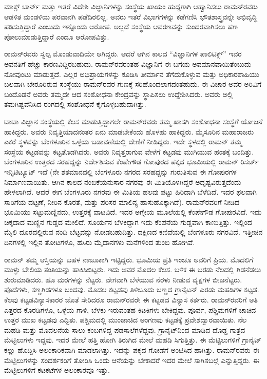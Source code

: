 ಮಾಕ್ಸ್ ಬಾರ್ನ್ ಮತ್ತು ಇತರೆ ವಿದೇಶಿ ವಿಜ್ಞಾನಿಗಳನ್ನು ಸಂಸ್ಥೆಯ ಖಾಯಂ ಹುದ್ದೆಗಾಗಿ ಆಹ್ವಾನಿಸಲು ರಾಮನ್‍ರವರು ಆಡಳಿತ ಮಂಡಳಿಯ ಪರವಾನಗಿ ಪಡೆದಿರಲಿಲ್ಲ. ಅವರು ಇತರೆ ವಿಭಾಗಗಳನ್ನು ಕಡೆಗಣಿಸಿ ಭೌತಶಾಸ್ತ್ರವನ್ನೇ ಅಭಿವೃದ್ಧಿ ಪಡಿಸುತ್ತಿದ್ದಾರೆ ಎಂಬುದು ಇನ್ನೊಂದು ಆರೋಪ. ಅಲ್ಲದೆ ಸಂಸ್ಥೆಯ ಆವರಣವನ್ನು ಸುಂದರವಾಗಿಸಲು ಹಣ ಪೋಲುಮಾಡುತ್ತಿದ್ದಾರೆ ಎಂದೂ ಆರೋಪವಿತ್ತು.

ರಾಮನ್‍ರವರು ಸ್ವಲ್ಪ ಮೊಂಡುವಾದಿಯೇ ಆಗಿದ್ದರು. ಆದರೆ ಆಗಿನ ಕಾಲದ “ವಿಜ್ಞಾನಿಗಳ ಪಾಲಿಟಿಕ್ಸ್” ಇವರ ಅವನತಿಗೆ ಹೆಚ್ಚು ಕಾರಣವಿದ್ದಿರಬಹುದು. ರಾಮನ್‍ರವರಂತಹ ವಿಜ್ಞಾನಿಗೆ ಈ ಬಗೆಯ ಅವಮಾನವಾಯಿತೆಂಬುದು ನೋವುಂಟು ಮಾಡುತ್ತದೆ. ಎಲ್ಲರ ಅಭಿಪ್ರಾಯಗಳನ್ನು ಕೂಡಿಸಿ ತೀರ್ಮಾನ ತೆಗೆದುಕೊಳ್ಳುವ ಮತ್ತು ಅಧಿಕಾರಶಾಹಿಯು ಬಲವಾಗಿ ಬೇರೂರಿರುವ ಸಂಸ್ಥೆಯು ರಾಮನ್‍ರವರ ಗುಣಕ್ಕೆ ಸರಿಹೊಂದಲಾಗದಂತಹುದು. ಈ ವಿಚಾರ ಅವರ ಅರಿವಿಗೆ ಬಂದೊಡನೆ ಅವರು ತಮ್ಮದೇ ಆದ ಸಂಶೋಧನಾ ಕೇಂದ್ರವನ್ನು ಸ್ಥಾಪಿಸಲು ಉದ್ದೇಶಿಸಿದರು. ಅವರು ಅಲ್ಲಿ ತಮಗಿಷ್ಟವೆನಿಸಿದ ರಂಗದಲ್ಲಿ ಸಂಶೋಧನೆ ಕೈಗೊಳ್ಳಬಹುದಾಗಿತ್ತು.



ಟಾಟಾ ವಿಜ್ಞಾನ ಸಂಸ್ಥೆಯಲ್ಲಿ ಕೆಲಸ ಮಾಡುತ್ತಿದ್ದಾಗಲೇ ರಾಮನ್‍ರವರು ತಮ್ಮ ಖಾಸಗಿ ಸಂಶೋಧನಾ ಸಂಸ್ಥೆಗೆ ಯೋಜನೆ ಹಾಕಿದ್ದರು. ಅವರು ನಿವೃತ್ತಿಯಾದನಂತರ ಏನು ಮಾಡಬೇಕೆಂದು ಹೊಳಹು ಹಾಕಿದ್ದರು. ಮೈಸೂರಿನ ಮಹಾರಾಜರು  ಎಕರೆ ಸ್ಥಳವನ್ನು ಬೆಂಗಳೂರಿನ ಒಳ್ಳೆಯ ಬಡಾವಣೆಯಲ್ಲಿ ದೇಣಿಗೆ ನೀಡಿದ್ದರು. ಇದೇ ಸ್ಥಳದಲ್ಲಿ ರಾಮನ್ ತಮ್ಮ ಸಂಸ್ಥೆಯ ಕಟ್ಟಡವನ್ನು ಕಟ್ಟತೊಡಗಿದರು. ಅವರು ನಿವೃತ್ತರಾಗುವ ವೇಳೆಗೆ ಕಟ್ಟಡವು ಮುಗಿಯುವ ಹಂತಕ್ಕೆ ಬಂದಿತ್ತು. ಬೆಂಗಳೂರಿನ ಉತ್ತರದ ಸರಹದ್ದನ್ನು ನಿರ್ದೇಶಿಸುವ ಕೆಂಪೇಗೌಡ ಗೋಪುರದ ಪಕ್ಕದ ಭೂಮಿಯಲ್ಲಿ ರಾಮನ್ ರಿಸರ್ಚ್ ಇನ್ಸಿಟಿಟ್ಯೂಟ್ ಇದೆ (ನೇ ಶತಮಾನದಲ್ಲಿ ಬೆಂಗಳೂರು ನಗರದ ಸರಹದ್ದನ್ನು ಗುರುತಿಸುವ ಈ ಗೋಪುರಗಳ ನಿರ್ಮಾಣವಾಯಿತು. ಆಗಿನ ಕಾಲದ ನಂಬಿಕೆಯನುಸಾರ ನಗರವು ಈ ಮಿತಿಯೊಳಗಿದ್ದರೆ ಅದೃಷ್ಟವಿರುತ್ತದೆಂದು ಹೇಳಲಾಗಿದೆ. ಆದರೆ ಈಗ ಬೆಂಗಳೂರು ನಗರವು ಈ ಮಿತಿಯ ಹಲವು ಪಟ್ಟು ಹಿರಿದಾಗಿ ಬೆಳೆದಿದೆ. ಇದರ ಫಲವಾಗಿ ಸಾರಿಗೆಯ ದಟ್ಟಣೆ, ನೀರಿನ ಕೊರತೆ, ಮತ್ತು ಪರಿಸರ ಮಾಲಿನ್ಯ ಹಾಸುಹೊಕ್ಕಾಗಿದೆ). ರಾಮನ್‍ರವರಿಗೆ ನೀಡಿದ ಭೂಮಿಯು ಸಟ್ಟುಮಣ್ಣಿನದು, ಉತ್ತರಕ್ಕೆ ವಾಟವಿದೆ. ಇದರ ಅಗ್ನೇಯ ಮೂಲೆಯಲ್ಲಿ ಕೆಂಪೇಗೌಡ ಗೋಪುರವಿದೆ. ಇದು ಚಿಕ್ಕದಾದ ಮಣ್ಣಿನ ಗುಡ್ಡದ ಮೇಲಿದೆ. ಸೂರ್ಯನ ಬೆಳಕಿದ್ದಾಗ ಇದು ಕೆಂಪನೆಯ ಗುಡ್ಡವಾಗಿ ಕಾಣುತ್ತಿತ್ತು. ಇಲ್ಲಿಂದ ಮೈಲಿ ದೂರದಲ್ಲಿರುವ ನಂದಿ ಬೆಟ್ಟವನ್ನು ನೋಡಬಹುದಿತ್ತು. ದಕ್ಷಿಣದ ಕಣಿವೆಯಲ್ಲಿ ಬೆಂಗಳೂರು ನಗರವಿದೆ. ಇತ್ತೀಚಿನ ದಿನಗಳಲ್ಲಿ ಇಲ್ಲಿನ ತೋಟಗಳೂ, ಹಸಿರು ಮೈದಾನಗಳು ಮನೆಗಳಿಂದ ತುಂಬಿ ಹೋಗಿವೆ.

ರಾಮನ್ ತಮ್ಮ ಆಸ್ತಿಯನ್ನು ಬಹಳ ನಾಜೂಕಾಗಿ ಇಟ್ಟಿದ್ದರು. ಭೂಮಿಯ ಪ್ರತಿ ಇಂಚೂ ಅವರಿಗೆ ಪ್ರಿಯ. ಮೊದಲಿಗೆ ಮುಳ್ಳು ಬೇಲಿಯ ತಂತಿಯನ್ನು ಹಾಕಿಸಿಬಿಟ್ಟರು. ಇದು ಅವರ ಮೊದಲ ಕೆಲಸ. ಬಳಿಕ ಈ ಬರಡು ನೆಲದಲ್ಲಿ ಗಿಡನೆಡಲು ಶುರುಮಾಡಿದರು. ಹೂ ಮರಗಳನ್ನು ನೆಟ್ಟರು. ವೇಗವಾಗಿ ಬೆಳೆಯುವ ನೆರಳು ನೀಡುವ ವೃಕ್ಷಗಳ ಬೀಜನೆಟ್ಟರು. ಪೊದೆಗಳು, ಸಣ್ಣಗಿಡಗಳೂ ಬಂದವು. ಮೊದಲ ಕಟ್ಟಡವು ತಿಳಿಬೂದು ಬಣ್ಣದ ಗ್ರಾನೈಟನ್ ಎರಡು ಮಹಡಿಗಳ ಕಟ್ಟಡ. ಕೆಲವು ಕಟ್ಟಡವಿನ್ಯಾಸಕಾರರ ಜೊತೆ ಸೇರಿದರೂ ರಾಮನ್‍ರವರೇ ಈ ಕಟ್ಟಡದ ವಿನ್ಯಾಸ ಕರ್ತರು. ರಾಮನ್‍ರವರಿಗೆ ಅತಿ ಎತ್ತರದ ಕೊಠಡಿಗಳೂ, ಒಳ್ಳೆಯ ಗಾಳಿ, ಬೆಳಕು ಇರುವಂತಹ ಕಿಟಕಿಗಳು ಬೇಕಿದ್ದವು. ಪೂರ್ವ, ಪಶ್ಚಿಮಗಳಿಗೆ ಚಾಚಿದ ಉತ್ತರ ಮುಖ ಕಟ್ಟಡವು ಎದ್ದಿತು. ಪಶ್ಚಿಮದಲ್ಲಿ ಮುಂಚಾಚಿದ ಅಂಗಣವು ಕಟ್ಟಡಕ್ಕೆ ಪ್ರವೇಶದ್ವಾರವಾಯಿತು. ನೆಲ ಮಹಡಿ ಮತ್ತು ಮೊದಲನೆಯ ಸಾಲು ಕಂಬಗಳಿದ್ದ ಪಡಸಾಲೆಗಳೆದ್ದವು. ಗ್ರಾನೈಟ್‍ನಿಂದ ಮಾಡಿದ ದೊಡ್ಡ ಗಾತ್ರದ ಮೆಟ್ಟಿಲುಗಳು ಇದ್ದವು. ಇದರ ಮೇಲೆ ಹತ್ತಿ ಹೋಗಿ  ತಿರುಗಿದ ಮೇಲೆ ಮಹಡಿ ಸಿಗುತ್ತಿತ್ತು. ಈ ಮೆಟ್ಟಿಲುಗಳಿಗೆ ಗ್ರಾನೈಟ್ ಕಲ್ಲು ಹೊದ್ದಿಸಿ ಅಲಂಕಾರಿಕವಾಗಿ ಮಾಡಲಾಗಿತ್ತು. ಇದನ್ನು ಪಕ್ಕದ ಗೋಡೆಗೆ ಅಂಟಿಸಿದ ಹಾಗಿತ್ತು. ರಾಮನ್‍ರವರು ಈ ಮೆಟ್ಟಿಲುಗಳನ್ನು ಸಂದರ್ಶಕರಿಗೆ ತೋರಿಸಿ ಒಂದು ಆನೆಯನ್ನು ಬೇಕಾದರೆ ಇದರ ಮೇಲೆ ಸಾಗಿಸಬಲ್ಲೆ ಎನ್ನುತ್ತಿದ್ದರು. ಈ ಮೆಟ್ಟಿಲುಗಳಿಗೆ ಕಟಕಟೆಗಳ ಅಲಂಕಾರವೂ ಇತ್ತು. 

